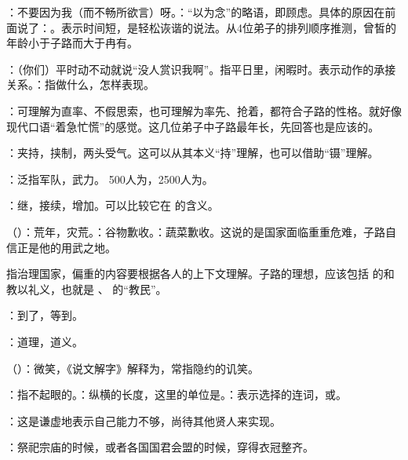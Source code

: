 {
\item {}：不要因为我（而不畅所欲言）呀。：“以为念”的略语，即顾虑。具体的原因在前面说了：。表示时间短，是轻松诙谐的说法。从4位弟子的排列顺序推测，曾皙的年龄小于子路而大于冉有。
\item {}：（你们）平时动不动就说“没人赏识我啊”。指平日里，闲暇时。表示动作的承接关系。：指做什么，怎样表现。
\item {}：可理解为直率、不假思索，也可理解为率先、抢着，都符合子路的性格。就好像现代口语“着急忙慌”的感觉。这几位弟子中子路最年长，先回答也是应该的。%
\item {}：夹持，挟制，两头受气。这可以从其本义“持”理解，也可以借助“镊”理解。
\item {}：泛指军队，武力。 500人为，2500人为。
\item {}：继，接续，增加。可以比较它在  的含义。
\item {}（）：荒年，灾荒。：谷物歉收。：蔬菜歉收。这说的是国家面临重重危难，子路自信正是他的用武之地。
\item {}指治理国家，偏重的内容要根据各人的上下文理解。子路的理想，应该包括  的和教以礼义，也就是 、 的“教民”。
\item {}：到了，等到。
\item {}：道理，道义。
\item {}（）：微笑，《说文解字》解释为，常指隐约的讥笑。
\item {}：指不起眼的。：纵横的长度，这里的单位是。：表示选择的连词，或。
\item {}：这是谦虚地表示自己能力不够，尚待其他贤人来实现。

\item {}：祭祀宗庙的时候，或者各国国君会盟的时候，穿得衣冠整齐。

}
